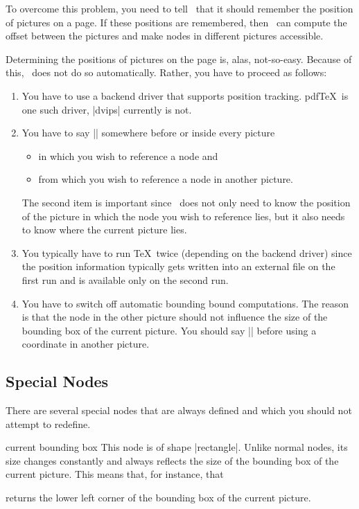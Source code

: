 To overcome this problem, you need to tell \pgfname\ that it should remember
the position of pictures on a page. If these positions are remembered, then
\pgfname\ can compute the offset between the pictures and make nodes in
different pictures accessible.

Determining the positions of pictures on the page is, alas, not-so-easy.
Because of this, \pgfname\ does not do so automatically. Rather, you have to
proceed as follows:
%
\begin{enumerate}
    \item You have to use a backend driver that supports position tracking.
        pdf\TeX\ is one such driver, |dvips| currently is not.
    \item You have to say |\pgfrememberpicturepositiononpagetrue| somewhere
        before or inside every picture
        \begin{itemize}
            \item in which you wish to reference a node and
            \item from which you wish to reference a node in another picture.
        \end{itemize}
        The second item is important since \pgfname\ does not only need to know
        the position of the picture in which the node you wish to reference
        lies, but it also needs to know where the current picture lies.
    \item You typically have to run \TeX\ twice (depending on the backend
        driver) since the position information typically gets written into an
        external file on the first run and is available only on the second run.
    \item You have to switch off automatic bounding bound computations. The
        reason is that the node in the other picture should not influence the
        size of the bounding box of the current picture. You should say
        || before using a coordinate in another
        picture.
\end{enumerate}


\subsection{Special Nodes}

There are several special nodes that are always defined and which you should
not attempt to redefine.

\begin{predefinednode}{current bounding box}
    This node is of shape |rectangle|. Unlike normal nodes, its size changes
    constantly and always reflects the size of the bounding box of the current
    picture. This means that, for instance, that
\begin{codeexample}
\end{codeexample}
    returns the lower left corner of the bounding box of the current picture.
\end{predefinednode}

